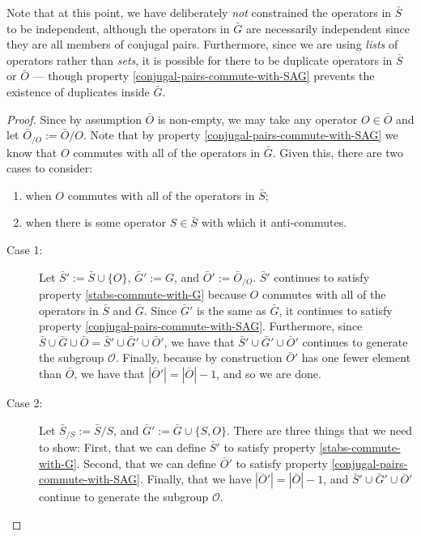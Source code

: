 \documentclass[twocolumn,showpacs,preprintnumbers,amsmath,amssymb,nofootinbib,pra,floatfix]{revtex4}
\newenvironment{remark}[1][Remark]{\begin{trivlist}
\item[\hskip \labelsep {\bfseries #1}]}{\end{trivlist}}
\newcommand{\lst}{\bar}
\begin{document}
\begin{remark}
Note that at this point, we have deliberately \emph{not} constrained the operators in $\lst S$ to be independent, although the operators in $\lst G$ are necessarily independent since they are all members of conjugal pairs.  Furthermore, since we are using \emph{lists} of operators rather than \emph{sets}, it is possible for there to be duplicate operators in $\lst S$ or $\lst O$ --- though property \ref{conjugal-pairs-commute-with-SAG} prevents the existence of duplicates inside $\lst G$.
\end{remark}

\begin{proof}
Since by assumption $\lst O$ is non-empty, we may take any operator $O\in \lst O$ and let $\lst O_{\slash O}:=\lst O\slash O$.  Note that by property \ref{conjugal-pairs-commute-with-SAG} we know that $O$ commutes with all of the operators in $\lst G$.  Given this, there are two cases to consider:
\begin{enumerate}
\item when $O$ commutes with all of the operators in $\lst S$;
\item when there is some operator $S\in\lst S$ with which it anti-commutes.
\end{enumerate}

\begin{description}
\item[Case 1:]
Let $\lst S':= \lst S \cup \{O\}$, $\lst G' := G$, and $\lst O' := \lst O_{\slash O}$.  $\lst S'$ continues to satisfy property \ref{stabs-commute-with-G} because $O$ commutes with all of the operators in $\lst S$ and $\lst G$.  Since $\lst G'$ is the same as $\lst G$, it continues to satisfy property \ref{conjugal-pairs-commute-with-SAG}.  Furthermore, since $\lst S\cup \lst G \cup \lst O=\lst S' \cup \lst G' \cup \lst O'$, we have that $\lst S' \cup \lst G' \cup \lst O'$ continues to generate the subgroup $\mathcal{O}$.  Finally, because by construction $\lst O'$ has one fewer element than $\lst O$, we have that $|\lst O'|=|\lst O|-1$, and so we are done.
\item[Case 2:]
Let $\lst S_{\slash S}:=\lst S\slash S$, and $\lst G' := \lst G \cup \{S,O\}$.  There are three things that we need to show:  First, that we can define $\lst S'$ to satisfy property \ref{stabs-commute-with-G}.  Second, that we can define $\lst O'$ to satisfy property \ref{conjugal-pairs-commute-with-SAG}.  Finally, that we have $|\lst O'|=|\lst O|-1$, and  $\lst S' \cup \lst G' \cup \lst O'$ continue to generate the subgroup $\mathcal{O}$.


\end{description}
\end{proof}
\end{document}
